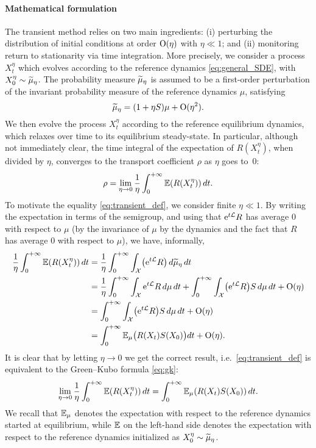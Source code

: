 \paragraph{Mathematical formulation} The transient method relies on two main ingredients: (i) perturbing the distribution of initial conditions at order $\mathrm{O}(\eta)$ with $\eta\ll 1$; and (ii) monitoring return to stationarity via time integration. More precisely, we consider a process $X_t^\eta$ which evolves according to the reference dynamics \eqref{eq:general_SDE}, with $X_0^\eta \sim \widetilde{\mu}_\eta$. The probability measure $\widetilde{\mu}_\eta$ is assumed to be a first-order perturbation of the invariant probability measure of the reference dynamics $\mu$, satisfying
%
\begin{equation}
	\widetilde{\mu}_\eta = (1+\eta S)\mu + \mathrm{O}(\eta^2).
	\label{eq:init_dist}
\end{equation}
%
We then evolve the process $X_t^\eta$ according to the reference equilibrium dynamics, which relaxes over time to its equilibrium steady-state. In particular, although not immediately clear, the time integral of the expectation of $R(X_t^\eta)$, when divided by $\eta$, converges to the transport coefficient $\rho$ as $\eta$ goes to~$0$:
%
\begin{equation}
	\rho = \lim_{\eta\to 0} \frac{1}{\eta}\int_0^{+\infty} \mathbb{E}(R(X_t^\eta)) \, dt.
	\label{eq:transient_def}
\end{equation}
%
To motivate the equality \eqref{eq:transient_def}, we consider finite $\eta\ll 1$. By writing the expectation in terms of the semigroup, and using that $\mathrm{e}^{t\mathcal{L}}R$ has average 0 with respect to $\mu$ (by the invariance of $\mu$ by the dynamics and the fact that $R$ has average 0 with respect to $\mu$), we have, informally,
%
\begin{align}
    \label{eq:gk_equiv1}
	\frac{1}{\eta}\int_0^{+\infty} \mathbb{E}(R(X_t^\eta)) \, dt &= \frac{1}{\eta} \int_0^{+\infty} \int_\mathcal{X} \bigl(\mathrm{e}^{t\mathcal{L}} R\bigr) \, d\widetilde{\mu}_\eta \, dt \\
	&= \frac{1}{\eta}\int_0^{+\infty} \int_\mathcal{X} \mathrm{e}^{t\mathcal{L}} R \, d\mu \, dt + \int_0^{+\infty} \int_\mathcal{X} \bigl(\mathrm{e}^{t\mathcal{L}} R\bigr) S \, d\mu \, dt + \mathrm{O}(\eta) \\
	&= \int_0^{+\infty} \int_\mathcal{X} \bigl(\mathrm{e}^{t\mathcal{L}} R\bigr) S \, d\mu \, dt + \mathrm{O}(\eta) \\
	&= \int_0^{+\infty} \mathbb{E}_\mu\bigl(R(X_t)S(X_0)\bigr) dt + \mathrm{O}(\eta).
    \label{eq:gk_equiv2}
\end{align}
%
It is clear that by letting $\eta\to 0$ we get the correct result, i.e.\ \eqref{eq:transient_def} is equivalent to the Green--Kubo formula \eqref{eq:gk}:
%
\begin{equation}
	\lim_{\eta\to 0}\frac{1}{\eta}\int_0^{+\infty} \mathbb{E}(R(X_t^\eta)) \, dt = \int_0^{+\infty} \mathbb{E}_\mu(R(X_t) S(X_0)) \, dt.
	\label{eq:td_gk}
\end{equation}
%
We recall that $\mathbb{E}_\mu$ denotes the expectation with respect to the reference dynamics started at equilibrium, while $\mathbb{E}$ on the left-hand side denotes the expectation with respect to the reference dynamics initialized as $X_0^\eta \sim \widetilde{\mu}_\eta$.


